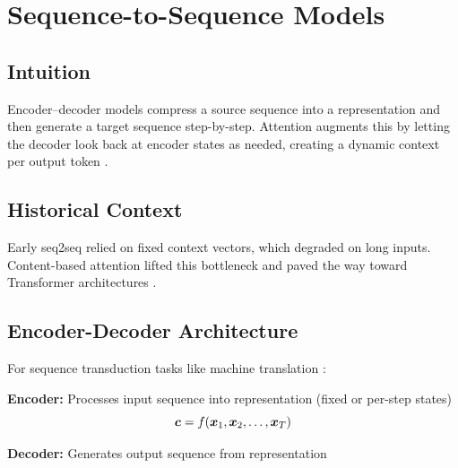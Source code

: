 
\section{Sequence-to-Sequence Models}
\label{sec:seq2seq}

\subsection*{Intuition}

Encoder–decoder models compress a source sequence into a representation and then generate a target sequence step-by-step. Attention augments this by letting the decoder look back at encoder states as needed, creating a dynamic context per output token \cite{Cho2014,Bahdanau2014}.

\subsection*{Historical Context}

Early seq2seq relied on fixed context vectors, which degraded on long inputs. Content-based attention \cite{Bahdanau2014} lifted this bottleneck and paved the way toward Transformer architectures \cite{Vaswani2017}.


\subsection{Encoder-Decoder Architecture}

For sequence transduction tasks like machine translation \cite{Cho2014,Bahdanau2014}:

\textbf{Encoder:} Processes input sequence into representation (fixed or per-step states)
\begin{equation}
\boldsymbol{c} = f(\boldsymbol{x}_1, \boldsymbol{x}_2, \ldots, \boldsymbol{x}_T)
\end{equation}

\textbf{Decoder:} Generates output sequence from representation
